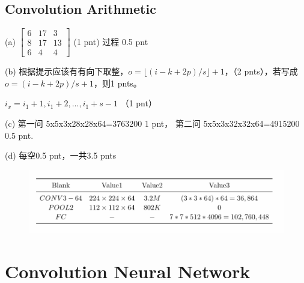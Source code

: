 \documentclass[12pt]{article}
\begin{document}
\subsection{Convolution Arithmetic} 

(a) 
$\begin{bmatrix}
		6 & 17 & 3 \\ 
		8& 17 & 13 \\ 
		6& 4&4 
	\end{bmatrix}$ 
(1 pnt) 过程 0.5 pnt

(b) 根据提示应该有有向下取整，$o=\lfloor (i-k+2p)/s \rfloor +1$，（2 pnts），若写成 $o= (i-k+2p)/s +1$，则1 pnts。 

$i_x = i_1 +1, i_1+2, ... ,i_1+s-1$ （1 pnt）

(c) 第一问 5x5x3x28x28x64=3763200 1 pnt， 第二问 5x5x3x32x32x64=4915200 0.5 pnt. 

(d) 每空0.5 pnt，一共3.5 pnts

\begin{figure}[h]
	\includegraphics[width=.8\textwidth]{fig/2018-05-03-21-10-02.png}
\end{figure}

\section{Convolution Neural Network}
\end{document}
